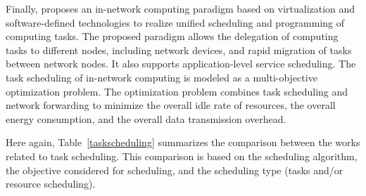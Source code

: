 Finally, \cite{INC6G} proposes an in-network computing paradigm based on virtualization and software-defined technologies to realize unified scheduling and programming of computing tasks. The proposed paradigm allows the delegation of computing tasks to different nodes, including network devices, and rapid migration of tasks between network nodes. It also supports application-level service scheduling. The task scheduling of in-network computing is modeled as a multi-objective optimization problem. The optimization problem combines task scheduling and network forwarding to minimize the overall idle rate of resources, the overall energy consumption, and the overall data transmission overhead. 

Here again, Table~\ref{taskscheduling} summarizes the comparison between the works related to task scheduling. This comparison is based on the scheduling algorithm, the objective considered for scheduling, and the scheduling type (tasks and/or resource scheduling).

